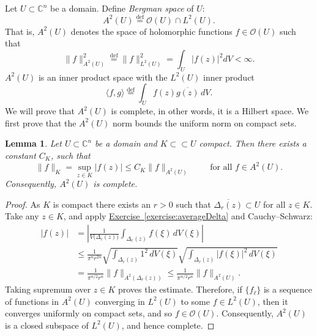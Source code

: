 \documentclass[12pt,openany]{book}
\newcommand{\linnprod}[2]{\langle #1 , #2 \rangle}
\newcommand{\sabs}[1]{\lvert {#1} \rvert}
\newcommand{\snorm}[1]{\lVert {#1} \rVert}
\newcommand{\abs}[1]{\left\lvert {#1} \right\rvert}
\newcommand{\C}{{\mathbb{C}}}
\newcommand{\sO}{{\mathscr{O}}}
\newcommand{\myindex}[1]{#1\index{#1}}
\theoremstyle{plain}
\newtheorem{lemma}[thm]{Lemma}
\theoremstyle{remark}
\theoremstyle{definition}
\theoremstyle{exercise}
\theoremstyle{example}
\newcommand{\exerciseref}[1]{\hyperref[#1]{Exercise~\ref*{#1}}}
\begin{document}
Let $U \subset \C^n$ be a domain.  Define
\emph{\myindex{Bergman space}} of $U$:
%
%
\begin{equation*}
A^2(U) \overset{\text{def}}{=} \sO(U) \cap L^2(U) .
\end{equation*}
That is, $A^2(U)$ denotes the space
of holomorphic functions $f \in \sO(U)$ such that
%
\begin{equation*}
\snorm{f}_{A^2(U)}^2 \overset{\text{def}}{=} \snorm{f}_{L^2(U)}^2
= \int_U \sabs{f(z)}^2 dV < \infty .
\end{equation*}
$A^2(U)$ is
an inner product space with the
$L^2(U)$ inner product
%
\begin{equation*}
\linnprod{f}{g} \overset{\text{def}}{=} \int_U f(z) \overline{g(z)} \, dV .
\end{equation*}
We will prove that $A^2(U)$ is
complete, in other words, it is a Hilbert space.  We first
prove that
the $A^2(U)$ norm bounds the
uniform norm on compact sets.

\begin{lemma} \label{lemma:bergmanKbound}
Let $U \subset \C^n$ be a domain and $K \subset \subset U$ compact.  Then
there exists a constant $C_K$, such that
\begin{equation*}
\snorm{f}_K
=
\sup_{z \in K} \sabs{f(z)}
\leq C_K \snorm{f}_{A^2(U)}
\qquad \text{ for all } f\in A^2(U) .
\end{equation*}
Consequently, $A^2(U)$ is complete.
\end{lemma}

\begin{proof}
As $K$ is compact there exists an $r > 0$ such that
$\overline{\Delta_r(z)} \subset U$
for all $z \in K$.
Take any $z \in K$, and
apply \exerciseref{exercise:averageDelta} and Cauchy--Schwarz:
\begin{equation*}
\begin{split}
\abs{f(z)} &=
\abs{\frac{1}{V\bigl(\Delta_r(z)\bigr)} \int_{\Delta_r(z)} f(\xi) \,
dV(\xi)}
\\
& \leq
\frac{1}{\pi^n r^{2n}}
\sqrt{\int_{\Delta_r(z)} 1^2 \, dV(\xi)}
\sqrt{\int_{\Delta_r(z)} \abs{f(\xi)}^2 \, dV(\xi)}
\\
& =
\frac{1}{\pi^{n/2} r^n}
\snorm{f}_{A^2(\Delta_r(z))}
\leq
\frac{1}{\pi^{n/2} r^n}
\snorm{f}_{A^2(U)} .
\end{split}
\end{equation*}
Taking supremum over $z \in K$ proves the estimate.
Therefore, if $\{ f_\ell \}$ is a sequence of functions in $A^2(U)$
converging in $L^2(U)$ to some $f \in
L^2(U)$, then it converges uniformly on compact sets, and so $f \in \sO(U)$.
Consequently, $A^2(U)$ is a closed subspace of $L^2(U)$, and hence complete.
\end{proof}
\end{document}
